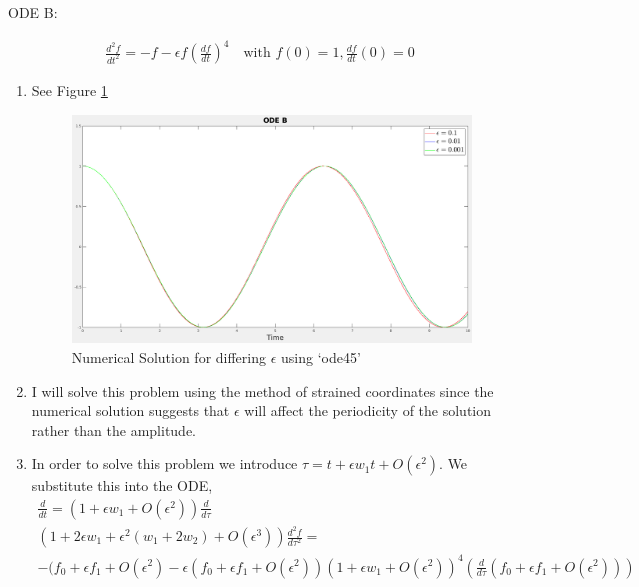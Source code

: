 \documentclass{article}
\begin{document}
\begin{enumerate}[label=\alph*.]
\end{enumerate}

\vspace{20pt}

ODE B: 

\begin{gather*}
    \frac{d^2f}{dt^2} = -f - \epsilon f \left(\frac{df}{dt}\right)^4 \quad
    \text{with } f(0) = 1, \frac{df}{dt}(0) = 0
\end{gather*}

\begin{enumerate}[label=\alph*.]
    \item See Figure \ref{fig:ODEB_num_sol}
        \begin{figure}[ht]
            \centering
            \includegraphics[width=.8\textwidth]{images/ODEB.png}
            \caption{Numerical Solution for differing $\epsilon$ using `ode45'}
            \label{fig:ODEB_num_sol}
        \end{figure}
    \item I will solve this problem using the method of strained coordinates
    since the numerical solution suggests that $\epsilon$ will affect the
    periodicity of the solution rather than the amplitude. 
    \item In order to solve this problem we introduce $\tau = t + \epsilon w_1 t
    + O(\epsilon^2)$. We substitute this into the ODE,
    \begin{gather*}
        \frac{d}{dt} = (1 + \epsilon w_1 + O(\epsilon^2))\frac{d}{d\tau}\\
        (1 + 2\epsilon w_1 + \epsilon^2(w_1 + 2w_2) +
        O(\epsilon^3))\frac{d^2f}{d\tau^2} = \\- (f_0 + \epsilon f_1 +
        O(\epsilon^2) - \epsilon (f_0 + \epsilon f_1 + O(\epsilon^2))(1 +
        \epsilon w_1 + O(\epsilon^2))^4\left(\frac{d}{d\tau}(f_0 + \epsilon f_1
        + O(\epsilon^2))\right)\\

\end{gather*}
\end{enumerate}
\end{document}

